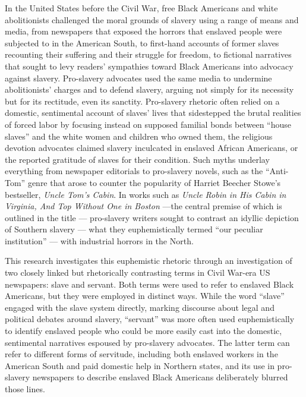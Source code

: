 \documentclass[11pt]{article}
\begin{document}
In the United States before the Civil War, free Black Americans and white abolitionists challenged the moral grounds of slavery using a range of means and media, from newspapers that exposed the horrors that enslaved people were subjected to in the American South, to first-hand accounts of former slaves recounting their suffering and their struggle for freedom, to fictional narratives that sought to levy readers’ sympathies toward Black Americans into 
advocacy against slavery. 
Pro-slavery advocates used the same media to undermine abolitionists’ charges and to defend slavery, arguing not simply for its necessity but for its rectitude, 
even its sanctity. 
Pro-slavery rhetoric often relied on a domestic, sentimental account of slaves’ lives that sidestepped the brutal realities of forced labor by focusing instead on supposed familial bonds between ``house slaves'' and the white women and children who owned them, the religious devotion advocates claimed slavery inculcated in enslaved African Americans, or the reported gratitude of slaves for their condition. 
Such myths underlay everything from newspaper editorials to pro-slavery novels, such as the ``Anti-Tom'' genre that arose to counter the popularity of Harriet Beecher Stowe’s bestseller, \textit{Uncle Tom’s Cabin}. 
In works such as \textit{Uncle Robin in His Cabin in Virginia, And Top Without One in Boston} —the central premise of which is outlined in the title — pro-slavery writers sought to contrast an idyllic depiction of Southern slavery 
— what they euphemistically termed “our peculiar institution” — with industrial horrors in the North. 

This research investigates this euphemistic rhetoric through an investigation of two closely linked but rhetorically contrasting terms in Civil War-era US newspapers: slave and servant. Both terms were used to refer to enslaved Black Americans, but they were employed in distinct ways. 
While the word ``slave'' engaged with the slave system directly, marking discourse about legal and political debates around slavery, ``servant'' was more often used euphemistically to identify enslaved people who could be more easily cast into the domestic, sentimental narratives espoused by pro-slavery advocates. 
The latter term can refer to different forms of servitude, including both enslaved workers in the American South and paid domestic help in Northern states, and its use in pro-slavery newspapers to describe enslaved Black Americans deliberately blurred those lines. 
\end{document}
